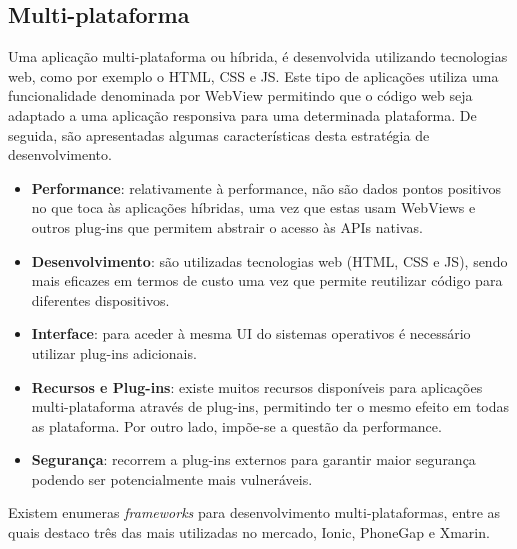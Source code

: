 \subsection{Multi-plataforma}



Uma aplicação multi-plataforma ou híbrida, é desenvolvida utilizando tecnologias web, como por exemplo o \ac{HTML}, \ac{CSS} e \ac{JS}. Este tipo de aplicações utiliza uma funcionalidade denominada por WebView permitindo que o código web seja adaptado a uma aplicação responsiva para uma determinada plataforma. De seguida, são apresentadas algumas características desta estratégia de desenvolvimento\cite{Ibm2012a}. 







\begin{itemize}
	\item \textbf{Performance}: relativamente à performance, não são dados pontos positivos no que toca às aplicações híbridas, uma vez que estas usam  WebViews e outros plug-ins que permitem abstrair o acesso às APIs nativas. 

	
	\item \textbf{Desenvolvimento}: são utilizadas tecnologias web (\ac{HTML}, \ac{CSS} e \ac{JS}), sendo mais eficazes em termos de custo uma vez que permite reutilizar código para diferentes dispositivos. 
	
	
	\item \textbf{Interface}: para aceder à mesma \ac{UI} do sistemas operativos é necessário utilizar plug-ins adicionais. 
	
	
	\item \textbf{Recursos e Plug-ins}: existe muitos recursos disponíveis  para aplicações \linebreak multi-plataforma através de plug-ins, permitindo ter o mesmo efeito em todas as plataforma. Por outro lado, impõe-se a questão da performance. 

	
	\item \textbf{Segurança}: recorrem a plug-ins externos para garantir maior segurança podendo ser potencialmente mais vulneráveis.
	
	
\end{itemize}

Existem enumeras \textit{frameworks} para desenvolvimento multi-plataformas, entre as quais destaco três das mais utilizadas no mercado, Ionic, PhoneGap e Xmarin. 


